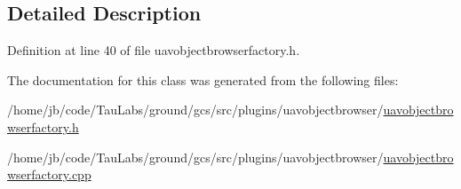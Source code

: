 \subsection{\-Detailed \-Description}


\-Definition at line 40 of file uavobjectbrowserfactory.\-h.



\-The documentation for this class was generated from the following files\-:\begin{DoxyCompactItemize}
\item 
/home/jb/code/\-Tau\-Labs/ground/gcs/src/plugins/uavobjectbrowser/\hyperlink{uavobjectbrowserfactory_8h}{uavobjectbrowserfactory.\-h}\item 
/home/jb/code/\-Tau\-Labs/ground/gcs/src/plugins/uavobjectbrowser/\hyperlink{uavobjectbrowserfactory_8cpp}{uavobjectbrowserfactory.\-cpp}\end{DoxyCompactItemize}
